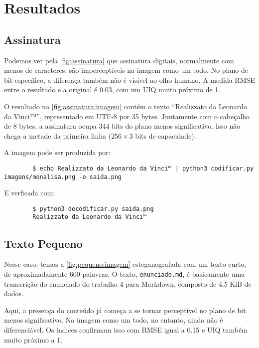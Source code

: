 \section{Resultados} \label{sec:resultados}

\subsection{Assinatura}

    Podemos ver pela \cref{fig:assinatura} que assinatura digitais, normalmente com menos de caracteres, são imperceptíveis na imagem como um todo. No plano de bit específico, a diferença também não é visível ao olho humano. A medida RMSE \autocite{ref:rmse} entre o resultado e a original é 0.03, com um UIQ \autocite{ref:uiq} muito próximo de 1.

    O resultado na \cref{fig:assinatura:imagem} contém o texto ``Realizzato da Leonardo da Vinci™'', representado em UTF-8 por 35 bytes. Juntamente com o cabeçalho de 8 bytes, a assinatura ocupa 344 bits do plano menos significativo. Isso não chega a metade da primeira linha ($256 \times 3$ bits de capacidade).

    A imagem pode ser produzida por:

    \begin{verbatim}
        $ echo Realizzato da Leonardo da Vinci™ | python3 codificar.py imagens/monalisa.png -o saida.png
    \end{verbatim}

    E verficada com:

    \begin{verbatim}
        $ python3 decodificar.py saida.png
        Realizzato da Leonardo da Vinci™
    \end{verbatim}

    

\subsection{Texto Pequeno} \label{sec:pequeno}

    

    Nesse caso, temos a \cref{fig:pequeno:imagem} esteganografada com um texto curto, de aproximadamente 600 palavras. O texto, \texttt{enunciado.md}, é basicamente uma transcrição do enunciado do trabalho 4 para Markdown, composto de 4.5 KiB de dados.

    Aqui, a presença do conteúdo já começa a se tornar perceptível no plano de bit menos significativo. Na imagem como um todo, no entanto, ainda não é diferenciável. Os índices confirmam isso com RMSE igual a 0.15 e UIQ também muito próximo a 1.

